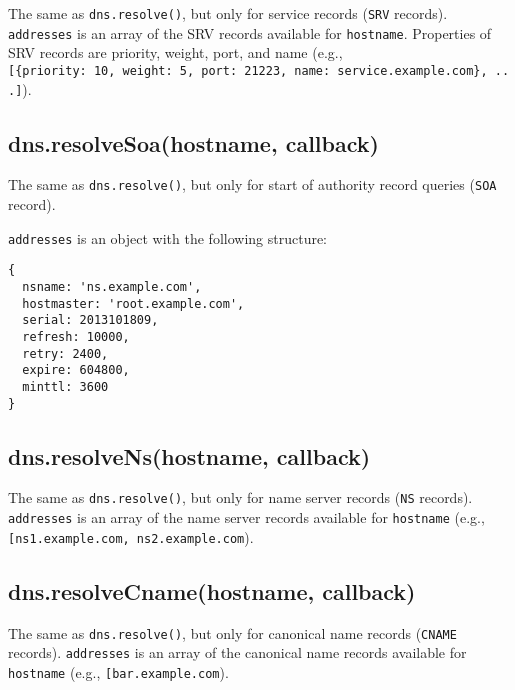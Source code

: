 The same as \texttt{dns.resolve()}, but only for service records
(\texttt{SRV} records). \texttt{addresses} is an array of the SRV
records available for \texttt{hostname}. Properties of SRV records are
priority, weight, port, and name (e.g.,
\texttt{{[}\{\textquotesingle{}priority\textquotesingle{}:\ 10,\ \textquotesingle{}weight\textquotesingle{}:\ 5,\ \textquotesingle{}port\textquotesingle{}:\ 21223,\ \textquotesingle{}name\textquotesingle{}:\ \textquotesingle{}service.example.com\textquotesingle{}\},\ ...{]}}).

\subsection{dns.resolveSoa(hostname,
callback)}\label{dns.resolvesoahostname-callback}

The same as \texttt{dns.resolve()}, but only for start of authority
record queries (\texttt{SOA} record).

\texttt{addresses} is an object with the following structure:

\begin{verbatim}
{
  nsname: 'ns.example.com',
  hostmaster: 'root.example.com',
  serial: 2013101809,
  refresh: 10000,
  retry: 2400,
  expire: 604800,
  minttl: 3600
}
\end{verbatim}

\subsection{dns.resolveNs(hostname,
callback)}\label{dns.resolvenshostname-callback}

The same as \texttt{dns.resolve()}, but only for name server records
(\texttt{NS} records). \texttt{addresses} is an array of the name server
records available for \texttt{hostname} (e.g.,
\texttt{{[}\textquotesingle{}ns1.example.com\textquotesingle{},\ \textquotesingle{}ns2.example.com\textquotesingle{}{]}}).

\subsection{dns.resolveCname(hostname,
callback)}\label{dns.resolvecnamehostname-callback}

The same as \texttt{dns.resolve()}, but only for canonical name records
(\texttt{CNAME} records). \texttt{addresses} is an array of the
canonical name records available for \texttt{hostname} (e.g.,
\texttt{{[}\textquotesingle{}bar.example.com\textquotesingle{}{]}}).

